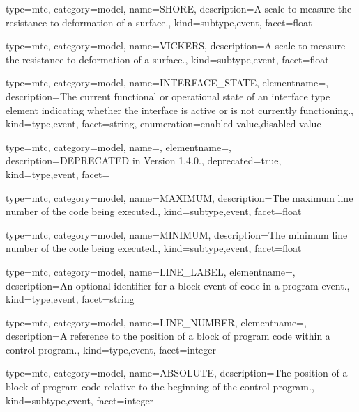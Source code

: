 {
  type=mtc,
  category=model,
  name={SHORE},
  description={A scale to measure the resistance to deformation of a surface.},
  kind={subtype,event},
  facet={\gls{float}}
}


{
  type=mtc,
  category=model,
  name={VICKERS},
  description={A scale to measure the resistance to deformation of a surface.},
  kind={subtype,event},
  facet={\gls{float}}
}


{
  type=mtc,
  category=model,
  name={INTERFACE\_STATE},
  elementname=,
  description={The current functional or operational state of an \gls{interface} type element indicating whether the interface is active or is not currently functioning.},
  kind={type,event},
  facet={\gls{string}},
  enumeration={\gls{enabled value},\gls{disabled value}}
}


{
  type=mtc,
  category=model,
  name=,
  elementname=,
  description={DEPRECATED in Version 1.4.0.},
  deprecated={true},
  kind={type,event},
  facet={}
}


{
  type=mtc,
  category=model,
  name={MAXIMUM},
  description={The maximum line number of the code being executed.},
  kind={subtype,event},
  facet={\gls{float}}
}


{
  type=mtc,
  category=model,
  name={MINIMUM},
  description={The minimum line number of the code being executed.},
  kind={subtype,event},
  facet={\gls{float}}
}


{
  type=mtc,
  category=model,
  name={LINE\_LABEL},
  elementname=,
  description={An optional identifier for a \gls{block event} of code in a \gls{program event}.},
  kind={type,event},
  facet={\gls{string}}
}


{
  type=mtc,
  category=model,
  name={LINE\_NUMBER},
  elementname=,
  description={A reference to the position of a block of program code within a control program.},
  kind={type,event},
  facet={\gls{integer}}
}


{
  type=mtc,
  category=model,
  name={ABSOLUTE},
  description={The position of a block of program code relative to the beginning of the control program.},
  kind={subtype,event},
  facet={\gls{integer}}
}


